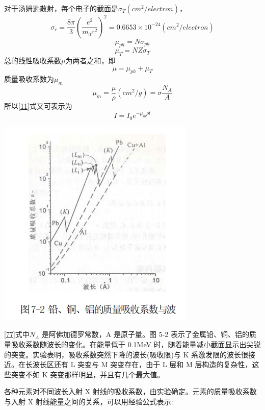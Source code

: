 \documentclass[hyperref]{ctexart}
\begin{document}
	对于汤姆逊散射，每个电子的截面是$\sigma_T(cm^2/electron)$，
	\begin{equation}
	\sigma_r = \frac{8\pi}{3}(\frac{e^2}{m_0c^2})^2 = 0.6653 \times 10^{-24}(cm^2/electron)
	\end{equation}
	\begin{equation}
	\mu_{ph} = N\sigma_{ph}
	\end{equation}
	\begin{equation}
	\mu_{T} = NZ\sigma_{T}
	\end{equation}
	总的线性吸收系数$\mu$为两者之和，即
	\begin{equation}
	\mu = \mu_{ph} + \mu_{T}
	\end{equation}
	质量吸收系数为$\mu_{m}$
	\begin{equation}
	\mu_m = \frac{\mu}{\rho}(cm^2/g) = \sigma \frac{N_A}{A}\label{77}
	\end{equation}
	所以\eqref{11}式又可表示为
	\begin{equation}
	I=I_0 e^{-\mu_m \rho t}\label{88}
	\end{equation}
	\begin{center}\includegraphics[scale=0.5]{t72}\end{center}

	\eqref{77}式中$ N_A$ 是阿佛加德罗常数，A 是原子量。图 5-2 表示了金属铅、铜、铝的质量吸收系数随波长的变化。在能量低于 0.1MeV 时，随着能量减小截面显示出尖锐的突变。实验表明，吸收系数突然下降的波长(吸收限)与 K 系激发限的波长很接近。在长波长区还有 L 突变与 M 突变存在，由于 L 层和 M 层构造的复杂性，这些突变不如 K 突变那样明显，并且有几个最大值。

	各种元素对不同波长入射 X 射线的吸收系数，由实验确定。元素的质量吸收系数与入射 X 射线能量之间的关系，可以用经验公式表示:
	
\end{document}
